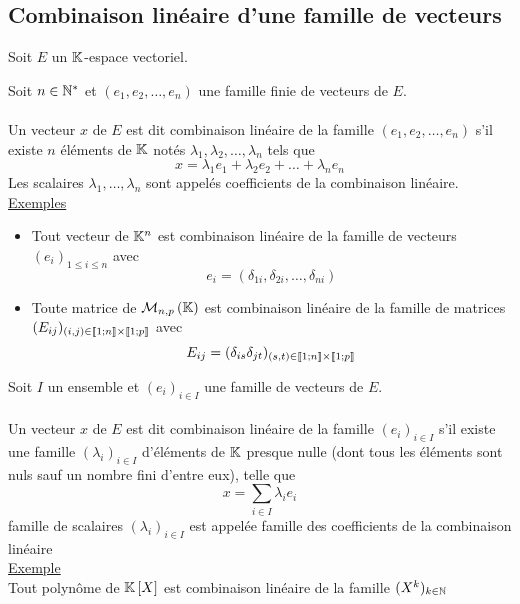 \subsection{Combinaison linéaire d’une famille de vecteurs}
Soit \(E\) un \(\mathbb{K}\)-espace vectoriel.
\begin{defprop}
    Soit \(n \in  \mathbb{N}^*\) et \((e_1, e_2, \dots, e_n)\) une famille finie de vecteurs de \(E\).\\~\\
    Un vecteur \(x\) de \(E\) est dit combinaison linéaire de la famille \((e_1, e_2, \dots, e_n)\) s’il existe \(n\) éléments de \(\mathbb{K}\) notés \(\lambda_1, \lambda_2, \dots, \lambda_n\) tels que
    \[x = \lambda_1 e_1 + \lambda_2e_2 + \dots + \lambda_ne_n\]
    Les scalaires \(\lambda_1, \dots, \lambda_n\) sont appelés coefficients de la combinaison linéaire.\\
    \underline{Exemples}\\
    \begin{itemize}
        \item Tout vecteur de \(\mathbb{K}^n\) est combinaison linéaire de la famille de vecteurs \((e_i)_{1\leq i\leq n}\) avec 
        \[e_i = (\delta_{1i}, \delta_{2i}, \dots, \delta_{ni})\] 
        \item Toute matrice de \(\M{n,p}\) est combinaison linéaire de la famille de matrices \((E_{ij})_{(i,j) \in \left\llbracket1;n\right\rrbracket \times \left\llbracket1;p\right\rrbracket}\) avec
        \[E_{ij} = (\delta _{is}\delta _{jt})_{(s,t) \in \left\llbracket1;n\right\rrbracket\times\left\llbracket1;p\right\rrbracket}\]
    \end{itemize}

\end{defprop}


\begin{defprop}
    Soit \(I\) un ensemble et \((e_i)_{i\in I}\) une famille de vecteurs de \(E\).\\~\\
    Un vecteur \(x\) de \(E\) est dit combinaison linéaire de la famille \((e_i)_{i\in I}\) s’il existe une famille \((\lambda_i)_{i\in I}\) d’éléments de \(\mathbb{K}\) presque nulle (\ie dont tous les éléments sont nuls sauf un nombre fini d’entre eux), telle que
    \[x = \sum_{i\in I}\lambda_ie_i\]
    famille de scalaires \((\lambda_i)_{i\in I}\) est appelée famille des coefficients de la combinaison linéaire \\
    \underline{Exemple}\\
    Tout polynôme de \(\mathbb{K} \left[X\right]\) est combinaison linéaire de la famille \((X^k)_{k \in \mathbb{N}}\)
\end{defprop}

